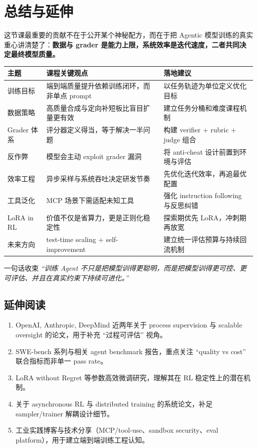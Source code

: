 \section{总结与延伸}

这节课最重要的贡献不在于公开某个神秘配方，而在于把 Agentic 模型训练的真实重心讲清楚了：\textbf{数据与 grader 是能力上限，系统效率是迭代速度，二者共同决定最终模型质量。}

\begin{longtable}{p{2.1cm}p{3.6cm}p{5.2cm}}
\toprule
\textbf{主题} & \textbf{课程关键观点} & \textbf{落地建议} \\
\midrule
训练目标 & 端到端质量提升依赖训练闭环，而非单点 prompt & 以任务轨迹为单位定义优化目标 \\
数据策略 & 高质量合成与定向补短板比盲目扩量更有效 & 建立任务分桶和难度课程机制 \\
Grader 体系 & 评分器定义得当，等于解决一半问题 & 构建 verifier + rubric + judge 组合 \\
反作弊 & 模型会主动 exploit grader 漏洞 & 将 anti-cheat 设计前置到环境与评估 \\
效率工程 & 异步采样与系统吞吐决定研发节奏 & 先优化迭代效率，再追最优配置 \\
工具泛化 & MCP 场景下需适配未知工具 & 强化 instruction following 与反思纠错 \\
LoRA in RL & 价值不仅是省算力，更是正则化稳定性 & 探索期优先 LoRA，冲刺期再放宽 \\
未来方向 & test-time scaling + self-improvement & 建立统一评估预算与持续回流机制 \\
\bottomrule
\end{longtable}

\begin{importantbox}{一句话收束}
\textit{``训练 Agent 不只是把模型训得更聪明，而是把模型训得更可控、更可评估、并且在真实约束下持续可进化。''}
\end{importantbox}

\subsection*{延伸阅读}
\begin{enumerate}
    \item OpenAI, Anthropic, DeepMind 近两年关于 process supervision 与 scalable oversight 的论文，用于补充 ``过程可评估'' 视角。
    \item SWE-bench 系列与相关 agent benchmark 报告，重点关注 ``quality vs cost'' 联合指标而非单一 pass rate。
    \item LoRA without Regret 等参数高效微调研究，理解其在 RL 稳定性上的潜在机制。
    \item 关于 asynchronous RL 与 distributed training 的系统论文，补足 sampler/trainer 解耦设计细节。
    \item 工业实践博客与技术分享（MCP/tool-use、sandbox security、eval platform），用于建立端到端训练工程认知。
\end{enumerate}


